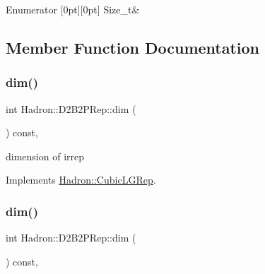 \begin{DoxyEnumFields}{Enumerator}
[0pt][0pt]{}\mbox{\label{structHadron_1_1D2B2PRep_a0642a5d157dee82cf2a2ef67e764645fa59eac7de031e346c2819ba31cc7f8384}} 
Size\+\_\+t&\\
\hline

\end{DoxyEnumFields}


\subsection{Member Function Documentation}
\mbox{\label{structHadron_1_1D2B2PRep_a963b6a6af4da28f02cb06e9ebe7e0273}} 
\subsubsection{\texorpdfstring{dim()}{dim()}\hspace{0.1cm}{\footnotesize\ttfamily [1/3]}}
{\footnotesize\ttfamily int Hadron\+::\+D2\+B2\+P\+Rep\+::dim (\begin{DoxyParamCaption}{ }\end{DoxyParamCaption}) const\hspace{0.3cm}{\ttfamily [inline]}, {\ttfamily [virtual]}}

dimension of irrep 

Implements \mbox{\hyperlink{structHadron_1_1CubicLGRep_a3acbaea26503ed64f20df693a48e4cdd}{Hadron\+::\+Cubic\+L\+G\+Rep}}.

\mbox{\label{structHadron_1_1D2B2PRep_a963b6a6af4da28f02cb06e9ebe7e0273}} 
\subsubsection{\texorpdfstring{dim()}{dim()}\hspace{0.1cm}{\footnotesize\ttfamily [2/3]}}
{\footnotesize\ttfamily int Hadron\+::\+D2\+B2\+P\+Rep\+::dim (\begin{DoxyParamCaption}{ }\end{DoxyParamCaption}) const\hspace{0.3cm}{\ttfamily [inline]}, {\ttfamily [virtual]}}

